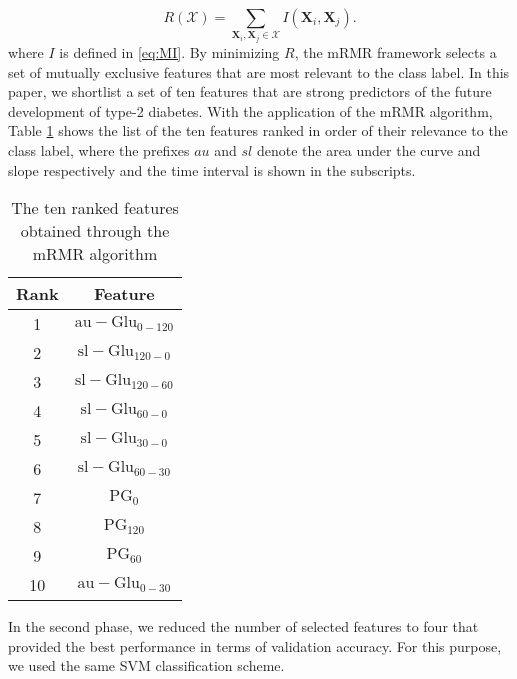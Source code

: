 \documentclass[journal,comsoc]{IEEEtran}
\begin{document}
%
\begin{equation}
  R(\mathcal X) = \sum_{\mathbf{X}_i, \mathbf{X}_j \in \mathcal{X}} I(\mathbf{X}_i, \mathbf{X}_j).
  \label{eq:R}
\end{equation}
%
where $I$ is defined in \eqref{eq:MI}. By minimizing $R$, the mRMR framework selects a set of mutually exclusive features that are most relevant to the class label. In this paper, we shortlist a set of ten features that are strong predictors of the future development of type-2 diabetes. With the application of the mRMR algorithm, Table \ref{tab:ranked} shows the list of the ten features ranked in order of their relevance to the class label, where the prefixes $au$ and $sl$ denote the area under the curve and slope respectively and the time interval is shown in the subscripts.
%
\begin{table}[!b]
\centering
\begin{tabular}{c c}
\toprule
Rank &  Feature\\
\midrule \midrule
1 & $\mathrm{au-Glu}_{0-120}$\\
2 & $\mathrm{sl-Glu}_{120-0}$\\
3 & $\mathrm{sl-Glu}_{120-60}$\\
4 & $\mathrm{sl-Glu}_{60-0}$\\
5 & $\mathrm{sl-Glu}_{30-0}$\\
6 & $\mathrm{sl-Glu}_{60-30}$\\
7 & $\mathrm{PG}_{0} $\\
8 & $\mathrm{PG}_{120}$\\
9 & $\mathrm{PG}_{60}$\\
10 & $\mathrm{au-Glu}_{0-30}$\\
\bottomrule
\end{tabular}
\caption{The ten ranked features obtained through the mRMR algorithm}
\label{tab:ranked}
\end{table}
%
 In the second phase, we reduced the number of selected features to four that provided the best performance in terms of validation accuracy.  For this purpose, we used the same SVM classification scheme.
\end{document}
